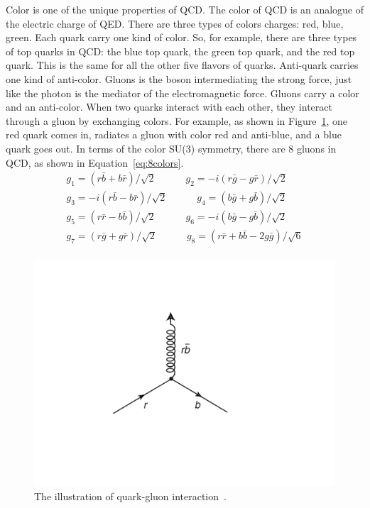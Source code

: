Color is one of the unique properties of QCD. The color of QCD is an analogue of the
electric charge of QED. There are three types of colors charges: red,
blue, green. Each quark carry one kind of color.
So, for example, there are 
three types of top quarks in QCD:  the blue top quark, the green top quark, and the red top quark.
This is the same for all the other five flavors of quarks.  
Anti-quark carries one kind of anti-color. 
Gluons is the boson intermediating the strong force, just like the
photon is the mediator of the electromagnetic force.
Gluons carry a color and an anti-color. 
When two quarks interact with each other, 
they interact through a gluon by exchanging colors.
For example, as shown in Figure~\ref{fig:color_rb}, one red quark comes in, radiates a gluon with color red and anti-blue, 
and a blue quark goes out. In terms of the color SU(3) symmetry, there are 8 gluons in QCD, as
shown in Equation~\ref{eq:8colors}.
\begin{equation}
\begin{split}
g_1 = (r\bar{b} + b\bar{r})/\sqrt{2}  \quad \quad \quad g_2 = -i(r\bar{g}-g\bar{r})/\sqrt{2} \\
g_3 = -i(r\bar{b}-b\bar{r})/\sqrt{2}   \quad \quad  \quad  g_4 = (b\bar{g} + g\bar{b})/\sqrt{2} \\
g_5 = (r\bar{r} - b\bar{b})/\sqrt{2}   \quad \quad  \quad  g_6 = -i(b\bar{g} - g\bar{b})/\sqrt{2} \\
g_7 = (r\bar{g} + g\bar{r})/\sqrt{2}   \quad \quad   \quad g_8 = (r\bar{r} + b\bar{b} -2g\bar{g})/\sqrt{6} \\
\end{split}
\label{eq:8colors}
\end{equation}


\begin{figure}[htb]
\centering
\includegraphics[width=.7\textwidth]{figures/rbcolor.png}
\caption{The illustration of quark-gluon interaction~\cite{particlebook1}.}
\label{fig:color_rb}
\end{figure}

